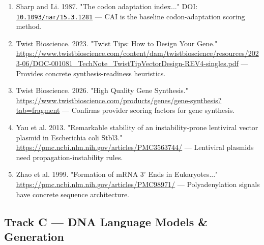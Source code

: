 \documentclass[11pt]{report}
\begin{document}
\begin{enumerate}
\item Sharp and Li. 1987. "The codon adaptation index..." DOI: \href{https://doi.org/10.1093/nar/15.3.1281}{\nolinkurl{10.1093/nar/15.3.1281}} — CAI is the baseline codon-adaptation scoring method.
\item Twist Bioscience. 2023. "Twist Tips: How to Design Your Gene." \url{https://www.twistbioscience.com/content/dam/twistbioscience/resources/2023-06/DOC-001081_TechNote_TwistTipVectorDesign-REV4-singles.pdf} — Provides concrete synthesis-readiness heuristics.
\item Twist Bioscience. 2026. "High Quality Gene Synthesis." \url{https://www.twistbioscience.com/products/genes/gene-synthesis?tab=fragment} — Confirms provider scoring factors for gene synthesis.
\item Yau et al. 2013. "Remarkable stability of an instability-prone lentiviral vector plasmid in Escherichia coli Stbl3." \url{https://pmc.ncbi.nlm.nih.gov/articles/PMC3563744/} — Lentiviral plasmids need propagation-instability rules.
\item Zhao et al. 1999. "Formation of mRNA 3' Ends in Eukaryotes..." \url{https://pmc.ncbi.nlm.nih.gov/articles/PMC98971/} — Polyadenylation signals have concrete sequence architecture.
\end{enumerate}

\subsection{Track C — DNA Language Models \& Generation}
\end{document}
